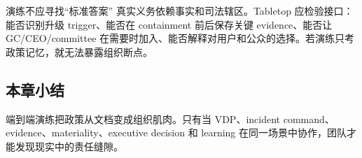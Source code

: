 \begin{warningbox}{演练不应寻找“标准答案”}
真实义务依赖事实和司法辖区。Tabletop 应检验接口：能否识别升级 trigger、能否在 containment 前后保存关键 evidence、能否让 GC/CEO/committee 在需要时加入、能否解释对用户和公众的选择。若演练只考政策记忆，就无法暴露组织断点。
\end{warningbox}

\subsection{本章小结}

端到端演练把政策从文档变成组织肌肉。只有当 VDP、incident command、evidence、materiality、executive decision 和 learning 在同一场景中协作，团队才能发现现实中的责任缝隙。

